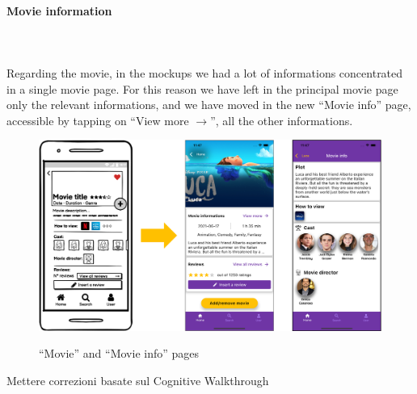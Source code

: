\documentclass[12pt, a4paper]{article}
\numberwithin{figure}{section}
\begin{document}
\paragraph{Movie information}
\mbox{}\\\\
Regarding the movie, in the mockups we had a lot of informations concentrated in a single movie page. For this reason
we have left in the principal movie page only the relevant informations, and we have moved in the new “Movie info” page, accessible
by tapping on “View more $\rightarrow$”, all the other informations.\\

\begin{figure}[H]
	\centering
	\includegraphics[width=1\textwidth]{images/prototype1/movieInfo.png}\\
	\caption{“Movie” and “Movie info” pages}
\end{figure}

\noindent

\noindent
Mettere correzioni basate sul Cognitive Walkthrough
\end{document}
